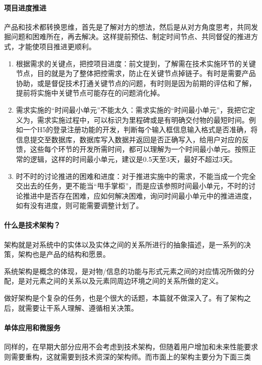 \documentclass[letterpaper,11pt,english]{sphinxmanual}
\begin{document}
\paragraph{项目进度推进}
\label{\detokenize{chapter_idea/understand_tech:id5}}
产品和技术都转换思维，首先是了解对方的想法，然后是从对方角度思考，共同发掘问题和困难所在，再去解决。这样提前预估、制定时间节点、共同督促的推进方式，才能使项目推进更顺利。
\begin{enumerate}
%
\item {} 
根据需求的关键点，把控项目进度：前文提到，了解需在技术实施环节的关键节点，目的就是为了整体把控需求，防止在关键节点掉链子。有时是需要产品协助，或是督促技术打通关键节点的问题，有时则是因为前期的评估和了解，提前将实施中关键节点可能存在的问题消化掉。

\item {} 
需求实施的“时间最小单元”不能太久：需求实施的“时间最小单元”，我把它定义为，需求实施过程中，可以标识为里程碑或是有明确交付物的最短时间。例如一个H5的登录注册功能的开发，判断每个输入框信息输入格式是否准确，将信息提交至数据库，数据库写入数据并返回是否正确写入，给用户对应的反馈，这些每个环节的开发所需时间，都可以理解为一个时间最小单元。按照正常的逻辑，这样的时间最小单元，建议是0.5天至3天，最好不超过3天。

\item {} 
时不时的讨论推进的困难和进度：对于推进实施中的需求，不能当成一个完全交出去的任务，更不能当“甩手掌柜”，而是应该参照时间最小单元，不时的讨论推进中是否存在困难，应如何解决困难，询问时间最小单元中的推进进度，如有没有进度，则可能需要调整计划了。

\end{enumerate}


\paragraph{什么是技术架构？}
\label{\detokenize{chapter_idea/understand_tech:id6}}
架构就是对系统中的实体以及实体之间的关系所进行的抽象描述，是一系列的决策，架构也是产品的结构和愿景。

系统架构是概念的体现，是对物/信息的功能与形式元素之间的对应情况所做的分配，是对元素之间的关系以及元素同周边环境之间的关系所做的定义。

做好架构是个复杂的任务，也是个很大的话题，本篇就不做深入了。有了架构之后，就需要让干系人理解、遵循相关决策。


\paragraph{单体应用和微服务}
\label{\detokenize{chapter_idea/understand_tech:id7}}
同样的，在早期大部分应用不会考虑到技术架构，但随着用户增加和未来性能要求则需要重构，这就需要到技术资深的架构师。而市面上的架构主要分为下面三类
\end{document}
